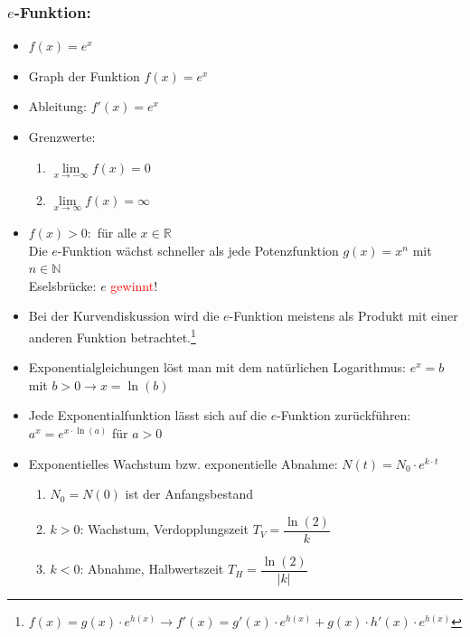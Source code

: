  \subsubsection{$e$-Funktion:}
 \begin{itemize}
 \item $f(x) = e^x$
 \item Graph der Funktion $f(x)= e^x$\\
\item Ableitung: $f'(x) = e^x$
\item Grenzwerte:\\
\begin{enumerate}
\item $\lim \limits_{x\longrightarrow -\infty} f(x) = 0$\\
\item $\lim \limits_{x\longrightarrow \infty} f(x) = \infty$
\end{enumerate}
\item $f(x) > 0: $ für alle $x\in \mathds{R}$\\
\mynote Die $e$-Funktion wächst schneller als jede Potenzfunktion $g(x)= x^n$ mit $n\in\mathds{N}$\\ \mynote Eselsbrücke: $e$ \textcolor{red}{gewinnt}!
\item Bei der Kurvendiskussion wird die $e$-Funktion meistens als Produkt mit einer anderen Funktion betrachtet.\footnote{$f(x) = g(x)\cdot e^{h(x)}  \longrightarrow f'(x) =g'(x)\cdot e^{h(x)} + g(x) \cdot h'(x) \cdot e^{h(x)} $}
\item Exponentialgleichungen löst man mit dem natürlichen Logarithmus: $e^{x} = b$ mit $b>0 \longrightarrow x = \ln(b)$
\item Jede Exponentialfunktion lässt sich auf die $e$-Funktion zurückführen: $a^x = e^{x\cdot \ln(a)}$ für $a>0$
\item Exponentielles Wachstum bzw. exponentielle Abnahme: $N(t) = N_0\cdot e^{k\cdot t}$\\
\begin{enumerate}
\item $N_0 = N(0)$ ist der Anfangsbestand\\
\item $k>0$: Wachstum, Verdopplungszeit $T_V = \dfrac{\ln(2)}{k}$\\
\item $k<0$: Abnahme, Halbwertszeit $T_H = \dfrac{\ln(2)}{|k|}$
\end{enumerate}
 \end{itemize}

